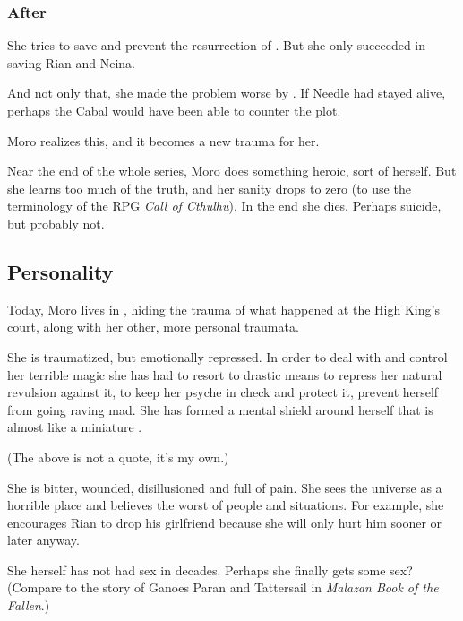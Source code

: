 \subsubsection{After \Malcur}
She tries to save \Malcur and prevent the resurrection of \Nithdornazsh. But she only succeeded in saving Rian and Neina. 

And not only that, she made the problem worse by . If Needle had stayed alive, perhaps the Cabal would have been able to counter the \Nithdornazsh{} plot. 

Moro realizes this, and it becomes a new trauma for her. 

Near the end of the whole series, Moro does something heroic, sort of  herself. But she learns too much of the truth, and her sanity drops to zero (to use the terminology of the RPG \emph{Call of Cthulhu}). In the end she dies. Perhaps suicide, but probably not. 









\subsection{Personality}
Today, Moro lives in \Malcur, hiding the trauma of what happened at the High King's court, along with her other, more personal traumata. 

She is traumatized, but emotionally repressed. In order to deal with and control her terrible \chaos{} magic she has had to resort to drastic means to repress her natural revulsion against it, to keep her psyche in check and protect it, prevent herself from going raving mad. She has formed a mental shield around herself that is almost like a miniature \Sephirah. 


(The above is not a quote, it's my own.)

She is bitter, wounded, disillusioned and full of pain. She sees the universe as a horrible place and believes the worst of people and situations. For example, she encourages Rian to drop his girlfriend because she will only hurt him sooner or later anyway. 

She herself has not had sex in decades. Perhaps she finally gets some sex? (Compare to the story of Ganoes Paran and Tattersail in \emph{Malazan Book of the Fallen}.) 

